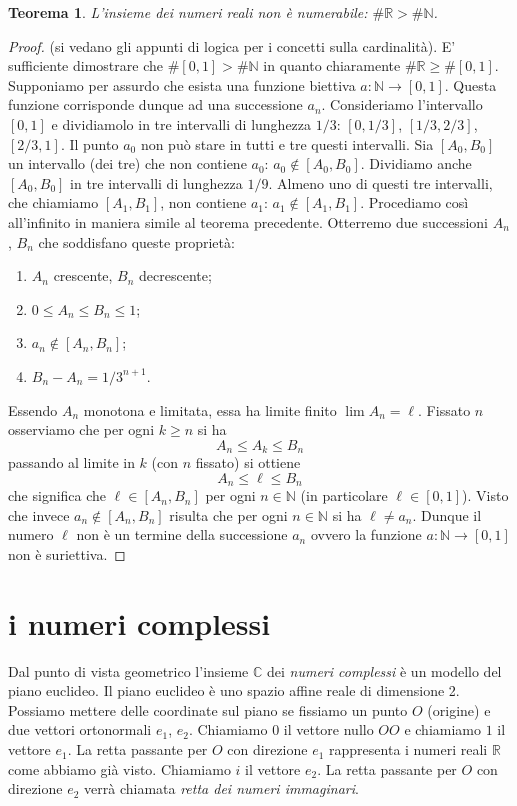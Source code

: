 \documentclass[italian,a4paper,oneside,headinclude]{scrbook}
\newcommand{\myemph}[1]{\emph{#1}\marginpar{#1}}
\newcommand{\CC}{\mathbb C}
\newcommand{\NN}{\mathbb N}
\newcommand{\RR}{\mathbb R}
\newtheorem{theorem}{Teorema}
\begin{document}
\begin{theorem}
L'insieme dei numeri reali non è numerabile: $\#\RR > \#\NN$.
\end{theorem}
%
\begin{proof}
(si vedano gli appunti di logica per i concetti sulla cardinalità).
E' sufficiente dimostrare che $\#[0,1] > \#\NN$ in quanto
chiaramente $\#\RR \ge \#[0,1]$.
Supponiamo per assurdo che esista una funzione biettiva $a\colon \NN \to [0,1]$.
Questa funzione corrisponde dunque ad una successione $a_n$.
Consideriamo l'intervallo $[0,1]$ e dividiamolo in tre intervalli  di lunghezza $1/3$: $[0,1/3]$, $[1/3,2/3]$, $[2/3,1]$. Il punto $a_0$ non può stare in tutti e tre questi intervalli. Sia $[A_0,B_0]$ un intervallo (dei tre) che non contiene $a_0$: $a_0 \not \in [A_0,B_0]$.
Dividiamo anche $[A_0,B_0]$ in tre intervalli di lunghezza $1/9$.
Almeno uno di questi tre intervalli, che chiamiamo $[A_1,B_1]$,
non contiene $a_1$: $a_1 \not \in [A_1,B_1]$.
Procediamo così all'infinito in maniera simile al teorema precedente.
Otterremo due successioni $A_n$, $B_n$ che soddisfano queste proprietà:
\begin{enumerate}
\item $A_n$ crescente, $B_n$ decrescente;
\item $0\le A_n \le B_n \le 1$;
\item $a_n \not \in [A_n, B_n]$;
\item $B_n - A_n = 1/3^{n+1}$.
\end{enumerate}

Essendo $A_n$ monotona e limitata, essa ha limite finito $\lim A_n = \ell$.
Fissato $n$ osserviamo che per ogni $k\ge n$ si ha
\[
  A_n \le A_k \le B_n
\]
passando al limite in $k$ (con $n$ fissato) si ottiene
\[
  A_n \le \ell \le B_n
\]
che significa che $\ell \in [A_n, B_n]$ per ogni $n\in \NN$
(in particolare $\ell \in [0,1]$).
Visto che invece $a_n \not \in [A_n, B_n]$ risulta che per
ogni $n\in \NN$ si ha $\ell \neq a_n$.
Dunque il numero $\ell$ non è un termine della successione $a_n$
ovvero la funzione $a\colon \NN \to [0,1]$ non è suriettiva.
\end{proof}

%
%
%
%
\chapter{i numeri complessi}

Dal punto di vista geometrico l'insieme $\CC$ dei \myemph{numeri complessi}
è un modello del piano euclideo.
\marginpar{$\CC$}
Il piano euclideo è uno spazio affine reale di dimensione 2.
Possiamo mettere delle coordinate sul piano se fissiamo un punto $O$ (origine)
e due vettori ortonormali $e_1$, $e_2$. Chiamiamo $0$ il vettore
nullo $OO$ e chiamiamo $1$ il vettore $e_1$.
La retta passante per $O$ con direzione $e_1$ rappresenta i numeri reali
$\RR$ come abbiamo già visto. Chiamiamo $i$ il vettore $e_2$.
La retta passante per $O$ con direzione $e_2$ verrà chiamata
\emph{retta dei numeri immaginari}.
\end{document}
